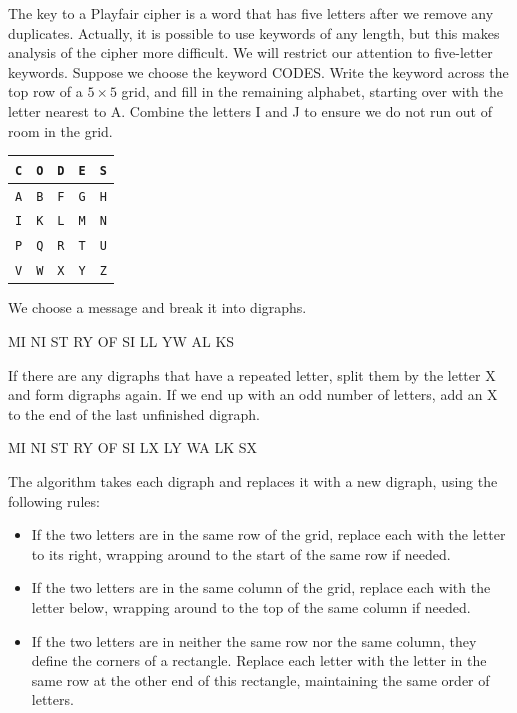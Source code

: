 \documentclass{book}
\theoremstyle{plain}
\theoremstyle{definition}
\newcommand{\ciphertext}[1]{\texttt{#1}} %
\begin{document}
The key to a Playfair cipher is a word that has five letters after we remove any duplicates. Actually, it is possible to use keywords of any length, but this makes analysis of the cipher more difficult. We will restrict our attention to five-letter keywords. Suppose we choose the keyword CODES. Write the keyword across the top row of a $5 \times 5$ grid, and fill in the remaining alphabet, starting over with the letter nearest to A. Combine the letters I and J to ensure we do not run out of room in the grid.

\begin{center}
\begin{tabular}{|c|c|c|c|c|}
\hline
\ciphertext{C} & \ciphertext{O} & \ciphertext{D} & \ciphertext{E} & \ciphertext{S} \\
\hline
\ciphertext{A} & \ciphertext{B} & \ciphertext{F} & \ciphertext{G} & \ciphertext{H} \\
\hline
\ciphertext{I} & \ciphertext{K} & \ciphertext{L} & \ciphertext{M} & \ciphertext{N} \\
\hline
\ciphertext{P} & \ciphertext{Q} & \ciphertext{R} & \ciphertext{T} & \ciphertext{U} \\
\hline
\ciphertext{V} & \ciphertext{W} & \ciphertext{X} & \ciphertext{Y} & \ciphertext{Z} \\
\hline
\end{tabular}
\end{center}

We choose a message and break it into digraphs.

\begin{center}
MI NI ST RY OF SI LL YW AL KS
\end{center}

If there are any digraphs that have a repeated letter, split them by the letter X and form digraphs again. If we end up with an odd number of letters, add an X to the end of the last unfinished digraph.

\begin{center}
MI NI ST RY OF SI LX LY WA LK SX
\end{center}

The algorithm takes each digraph and replaces it with a new digraph, using the following rules:
\begin{itemize}
\item If the two letters are in the same row of the grid, replace each with the letter to its right, wrapping around to the start of the same row if needed.
\item If the two letters are in the same column of the grid, replace each with the letter below, wrapping around to the top of the same column if needed.
\item If the two letters are in neither the same row nor the same column, they define the corners of a rectangle. Replace each letter with the letter in the same row at the other end of this rectangle, maintaining the same order of letters.
\end{itemize}
\end{document}
